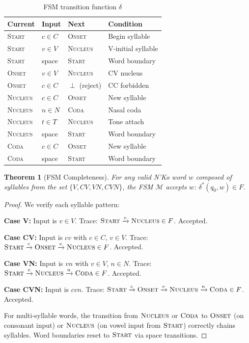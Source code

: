 \documentclass[11pt]{article}
\newtheorem{theorem}{Theorem}
\theoremstyle{remark}
\begin{document}
\begin{table}[h]
\centering
\caption{FSM transition function $\delta$}
\label{tab:fsm}
\begin{tabular}{llll}
\toprule
Current & Input & Next & Condition \\
\midrule
\textsc{Start} & $c \in C$ & \textsc{Onset} & Begin syllable \\
\textsc{Start} & $v \in V$ & \textsc{Nucleus} & V-initial syllable \\
\textsc{Start} & space & \textsc{Start} & Word boundary \\
\textsc{Onset} & $v \in V$ & \textsc{Nucleus} & CV nucleus \\
\textsc{Onset} & $c \in C$ & $\perp$ (reject) & CC forbidden \\
\textsc{Nucleus} & $c \in C$ & \textsc{Onset} & New syllable \\
\textsc{Nucleus} & $n \in N$ & \textsc{Coda} & Nasal coda \\
\textsc{Nucleus} & $t \in T$ & \textsc{Nucleus} & Tone attach \\
\textsc{Nucleus} & space & \textsc{Start} & Word boundary \\
\textsc{Coda} & $c \in C$ & \textsc{Onset} & New syllable \\
\textsc{Coda} & space & \textsc{Start} & Word boundary \\
\bottomrule
\end{tabular}
\end{table}

\begin{theorem}[FSM Completeness]
For any valid N'Ko word $w$ composed of syllables from the set $\{V, CV, VN, CVN\}$, the FSM $\mathcal{M}$ accepts $w$: $\delta^*(q_0, w) \in F$.
\end{theorem}

\begin{proof}
We verify each syllable pattern:

\textbf{Case V:} Input is $v \in V$. Trace: $\textsc{Start} \xrightarrow{v} \textsc{Nucleus} \in F$. Accepted.

\textbf{Case CV:} Input is $cv$ with $c \in C$, $v \in V$. Trace: $\textsc{Start} \xrightarrow{c} \textsc{Onset} \xrightarrow{v} \textsc{Nucleus} \in F$. Accepted.

\textbf{Case VN:} Input is $vn$ with $v \in V$, $n \in N$. Trace: $\textsc{Start} \xrightarrow{v} \textsc{Nucleus} \xrightarrow{n} \textsc{Coda} \in F$. Accepted.

\textbf{Case CVN:} Input is $cvn$. Trace: $\textsc{Start} \xrightarrow{c} \textsc{Onset} \xrightarrow{v} \textsc{Nucleus} \xrightarrow{n} \textsc{Coda} \in F$. Accepted.

For multi-syllable words, the transition from $\textsc{Nucleus}$ or $\textsc{Coda}$ to $\textsc{Onset}$ (on consonant input) or $\textsc{Nucleus}$ (on vowel input from $\textsc{Start}$) correctly chains syllables. Word boundaries reset to $\textsc{Start}$ via space transitions.
\end{proof}
\end{document}
